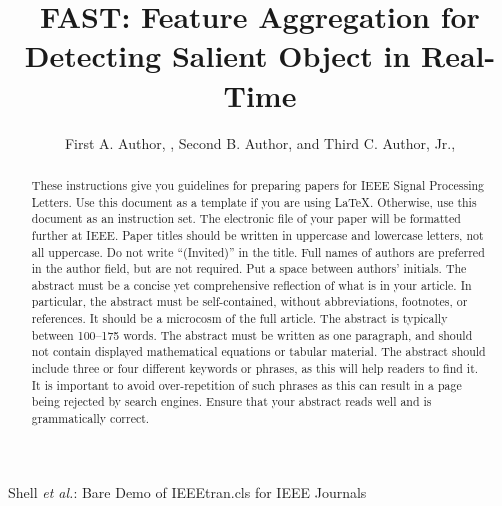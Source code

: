 \documentclass[journal]{IEEEtran}
\begin{document}
\title{FAST: Feature Aggregation for Detecting Salient Object in Real-Time }

\author{First A. Author, , Second B. Author, and Third C. Author, Jr., }

{Shell \MakeLowercase{\textit{et al.}}: Bare Demo of IEEEtran.cls for IEEE Journals}
\maketitle

\begin{abstract}
These instructions give you guidelines for preparing papers for IEEE Signal Processing Letters. Use this document as a template if you are using \LaTeX. Otherwise, use this document as an instruction set. The electronic file of your paper will be formatted further at IEEE. Paper titles should be written in uppercase and lowercase letters, not all uppercase. Do not write ``(Invited)'' in the title. Full names of authors are preferred in the author field, but are not required. Put a space between authors’ initials. The abstract must be a concise yet comprehensive reflection of what is in your article. In particular, the abstract must be self-contained, without abbreviations, footnotes, or references. It should be a microcosm of the full article. The abstract is typically between 100--175 words. The abstract must be written as one paragraph, and should not contain displayed mathematical equations or tabular material. The abstract should include three or four different keywords or phrases, as this will help readers to find it. It is important to avoid over-repetition of such phrases as this can result in a page being rejected by search engines. Ensure that your abstract reads well and is grammatically correct.
\end{abstract}
\end{document}
